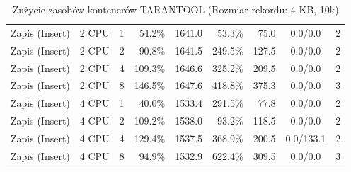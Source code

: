 \begin{table}[ht]
{\begin{tabular}{llcrrrrcc}
Zapis (Insert) & 2 CPU & 1 & 54.2\% & 1641.0 & 53.3\% & 75.0 & 0.0/0.0 & 2 \\
Zapis (Insert) & 2 CPU & 2 & 90.8\% & 1641.5 & 249.5\% & 127.5 & 0.0/0.0 & 2 \\
Zapis (Insert) & 2 CPU & 4 & 109.3\% & 1646.6 & 325.2\% & 209.5 & 0.0/0.0 & 2 \\
Zapis (Insert) & 2 CPU & 8 & 146.5\% & 1647.6 & 418.8\% & 375.3 & 0.0/0.0 & 3 \\
Zapis (Insert) & 4 CPU & 1 & 40.0\% & 1533.4 & 291.5\% & 77.8 & 0.0/0.0 & 2 \\
Zapis (Insert) & 4 CPU & 2 & 109.2\% & 1538.0 & 93.2\% & 118.5 & 0.0/0.0 & 2 \\
Zapis (Insert) & 4 CPU & 4 & 129.4\% & 1537.5 & 368.9\% & 200.5 & 0.0/133.1 & 2 \\
Zapis (Insert) & 4 CPU & 8 & 94.9\% & 1532.9 & 622.4\% & 309.5 & 0.0/0.0 & 3 \\
\bottomrule
\end{tabular}%
}
\caption{Zużycie zasobów kontenerów TARANTOOL (Rozmiar rekordu: 4 KB, 10k)}
\label{tab:resources_tarantool_medium_10000}
\end{table}
